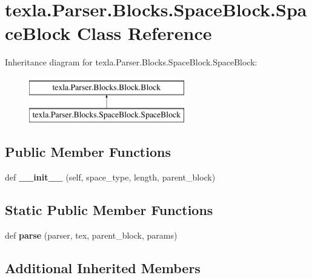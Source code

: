 \hypertarget{classtexla_1_1Parser_1_1Blocks_1_1SpaceBlock_1_1SpaceBlock}{}\section{texla.\+Parser.\+Blocks.\+Space\+Block.\+Space\+Block Class Reference}
\label{classtexla_1_1Parser_1_1Blocks_1_1SpaceBlock_1_1SpaceBlock}
Inheritance diagram for texla.\+Parser.\+Blocks.\+Space\+Block.\+Space\+Block\+:\begin{figure}[H]
\begin{center}
\leavevmode
\includegraphics[height=2.000000cm]{classtexla_1_1Parser_1_1Blocks_1_1SpaceBlock_1_1SpaceBlock}
\end{center}
\end{figure}
\subsection*{Public Member Functions}
\begin{DoxyCompactItemize}
\item 
\hypertarget{classtexla_1_1Parser_1_1Blocks_1_1SpaceBlock_1_1SpaceBlock_a0e86fa42c902a08313373babfa01f35d}{}\label{classtexla_1_1Parser_1_1Blocks_1_1SpaceBlock_1_1SpaceBlock_a0e86fa42c902a08313373babfa01f35d} 
def {\bfseries \+\_\+\+\_\+init\+\_\+\+\_\+} (self, space\+\_\+type, length, parent\+\_\+block)
\end{DoxyCompactItemize}
\subsection*{Static Public Member Functions}
\begin{DoxyCompactItemize}
\item 
\hypertarget{classtexla_1_1Parser_1_1Blocks_1_1SpaceBlock_1_1SpaceBlock_af8d4de786d3160a00f25446ccf00adf7}{}\label{classtexla_1_1Parser_1_1Blocks_1_1SpaceBlock_1_1SpaceBlock_af8d4de786d3160a00f25446ccf00adf7} 
def {\bfseries parse} (parser, tex, parent\+\_\+block, params)
\end{DoxyCompactItemize}
\subsection*{Additional Inherited Members}


